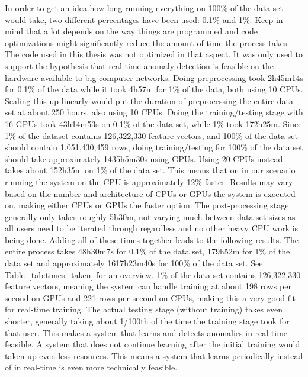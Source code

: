 In order to get an idea how long running everything on 100\% of the data set would take, two different percentages have been used: 0.1\% and 1\%. Keep in mind that a lot depends on the way things are programmed and code optimizations might significantly reduce the amount of time the process takes. The code used in this thesis was not optimized in that aspect. It was only used to support the hypothesis that real-time anomaly detection is feasible on the hardware available to big computer networks. Doing preprocessing took 2h45m14s for 0.1\% of the data while it took 4h57m for 1\% of the data, both using 10 CPUs. Scaling this up linearly would put the duration of preprocessing the entire data set at about 250 hours, also using 10 CPUs. Doing the training/testing stage with 16 GPUs took 43h14m53s on 0.1\% of the data set, while 1\% took 172h25m. Since 1\% of the dataset contains 126,322,330 feature vectors, and 100\% of the data set should contain 1,051,430,459 rows, doing training/testing for 100\% of the data set should take approximately 1435h5m30s using GPUs. Using 20 CPUs instead takes about 152h35m on 1\% of the data set. This means that on in our scenario running the system on the CPU is approximately 12\% faster. Results may vary based on the number and architecture of CPUs or GPUs the system is executed on, making either CPUs or GPUs the faster option. The post-processing stage generally only takes roughly 5h30m, not varying much between data set sizes as all users need to be iterated through regardless and no other heavy CPU work is being done. Adding all of these times together leads to the following results. The entire process takes 48h30m7s for 0.1\% of the data set, 179h52m for 1\% of the data set and approximately 1617h23m40s for 100\% of the data set. See Table~\ref{tab:times_taken} for an overview. 1\% of the data set contains 126,322,330 feature vectors, meaning the system can handle training at about 198 rows per second on GPUs and 221 rows per second on CPUs, making this a very good fit for real-time training. The actual testing stage (without training) takes even shorter, generally taking about 1/100th of the time the training stage took for that user. This makes a system that learns and detects anomalies in real-time feasible. A system that does not continue learning after the initial training would taken up even less resources. This means a system that learns periodically instead of in real-time is even more technically feasible.

